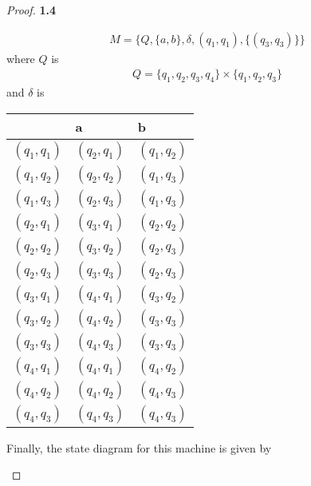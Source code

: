 \documentclass[11pt]{article}
\theoremstyle{definition}
\begin{document}
\begin{proof}{\textbf{1.4}}
\begin{itemize}
        \begin{align*}
            M = \{Q, \{a,b\}, \delta, (q_1,q_1), \{(q_3, q_3)\}\}
        \end{align*}
        where $Q$ is 
        \begin{align*}
            Q =\{q_1, q_2, q_3, q_4\} \times \{q_1, q_2, q_3\}
        \end{align*}
        and $\delta$ is 
        \begin{center}
        \begin{tabular}{l|ll}
                  & a     & b     \\ \hline
            $(q_1, q_1)$ & $(q_2, q_1)$ & $(q_1, q_2)$ \\
            $(q_1, q_2)$ & $(q_2, q_2)$ & $(q_1, q_3)$ \\
            $(q_1, q_3)$ & $(q_2, q_3)$ & $(q_1, q_3)$ \\
            $(q_2, q_1)$ & $(q_3, q_1)$ & $(q_2, q_2)$ \\
            $(q_2, q_2)$ & $(q_3, q_2)$ & $(q_2, q_3)$ \\
            $(q_2, q_3)$ & $(q_3, q_3)$ & $(q_2, q_3)$ \\
            $(q_3, q_1)$ & $(q_4, q_1)$ & $(q_3, q_2)$ \\
            $(q_3, q_2)$ & $(q_4, q_2)$ & $(q_3, q_3)$ \\
            $(q_3, q_3)$ & $(q_4, q_3)$ & $(q_3, q_3)$ \\
            $(q_4, q_1)$ & $(q_4, q_1)$ & $(q_4, q_2)$ \\
            $(q_4, q_2)$ & $(q_4, q_2)$ & $(q_4, q_3)$ \\
            $(q_4, q_3)$ & $(q_4, q_3)$ & $(q_4, q_3)$ \\
        \end{tabular}
        \end{center}
        Finally, the state diagram for this machine is given by
        \begin{figure}[H]
            \centering %
\end{figure}
\end{itemize}
\end{proof}
\end{document}
